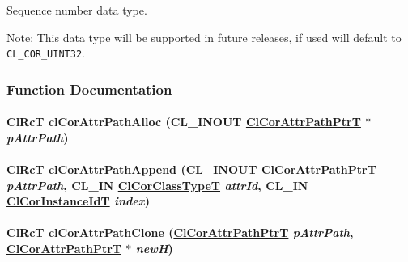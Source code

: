 \begin{Desc}
\begin{description}
\item[{\em 
\hypertarget{group__group13_gga325a113}{
CL\_\-COR\_\-SEQUENCE32}
\label{group__group13_gga325a113}
}]Sequence number data type. \begin{Desc}
\item[Note:]This data type will be supported in future releases, if used will default to {\tt CL\_\-COR\_\-UINT32}. \end{Desc}
\end{description}
\end{Desc}



\subsubsection{Function Documentation}
\hypertarget{group__group13_ga130}{
\paragraph[clCorAttrPathAlloc]{\setlength{\rightskip}{0pt plus 5cm}Cl\-Rc\-T cl\-Cor\-Attr\-Path\-Alloc (CL\_\-INOUT \hyperlink{struct_cl_cor_attr_path}{Cl\-Cor\-Attr\-Path\-Ptr\-T} $\ast$ {\em p\-Attr\-Path})}\hfill}
\label{group__group13_ga130}


\hypertarget{group__group13_ga135}{
\paragraph[clCorAttrPathAppend]{\setlength{\rightskip}{0pt plus 5cm}Cl\-Rc\-T cl\-Cor\-Attr\-Path\-Append (CL\_\-INOUT \hyperlink{struct_cl_cor_attr_path}{Cl\-Cor\-Attr\-Path\-Ptr\-T} {\em p\-Attr\-Path}, CL\_\-IN \hyperlink{group__group13_ga2}{Cl\-Cor\-Class\-Type\-T} {\em attr\-Id}, CL\_\-IN \hyperlink{group__group13_ga4}{Cl\-Cor\-Instance\-Id\-T} {\em index})}\hfill}
\label{group__group13_ga135}


\hypertarget{group__group13_ga142}{
\paragraph[clCorAttrPathClone]{\setlength{\rightskip}{0pt plus 5cm}Cl\-Rc\-T cl\-Cor\-Attr\-Path\-Clone (\hyperlink{struct_cl_cor_attr_path}{Cl\-Cor\-Attr\-Path\-Ptr\-T} {\em p\-Attr\-Path}, \hyperlink{struct_cl_cor_attr_path}{Cl\-Cor\-Attr\-Path\-Ptr\-T} $\ast$ {\em new\-H})}\hfill}
\label{group__group13_ga142}


